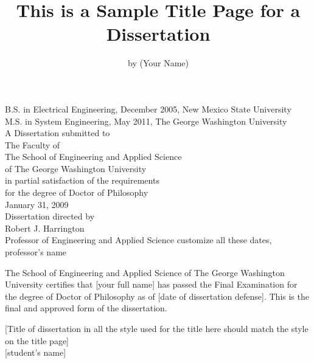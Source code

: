 \documentclass[letterpaper,12pt]{article}
\begin{document}
%


\title{\singlespacing\normalsize\bf This is a Sample Title Page for a Dissertation}
\author{\normalsize by (Your Name)}
\date{}
\maketitle
\thispagestyle{empty}
\begin{center}
B.S. in Electrical Engineering, December 2005, New Mexico State University \\
M.S. in System Engineering, May 2011, The George Washington University\\[\baselineskip]
A Dissertation submitted to\\[\baselineskip]
The Faculty of\\The School of Engineering and Applied Science\\ of The George
Washington University\\ in partial satisfaction of the requirements\\ for the degree
of Doctor of Philosophy\\[\baselineskip]
January 31, 2009\\[\baselineskip]
Dissertation directed by\\[\baselineskip]
Robert J. Harrington\\Professor of Engineering and Applied Science %
customize all these dates, professor's name
\end{center}
\pagestyle{plain}
\setcounter{page}{1}
\newpage
\doublespacing
\noindent The School of Engineering and Applied Science of The George Washington
University certifies that [your full name] has passed the Final Examination for the
degree of Doctor of Philosophy as of [date of dissertation defense].  This is the
final and approved form of the dissertation.
\begin{center}
\singlespacing
{\normalsize  [Title of dissertation in all the style used for the title here should
match the style on the title page]}\\[\baselineskip]
{\normalsize [student's name]}
\end{center}
\end{document}

